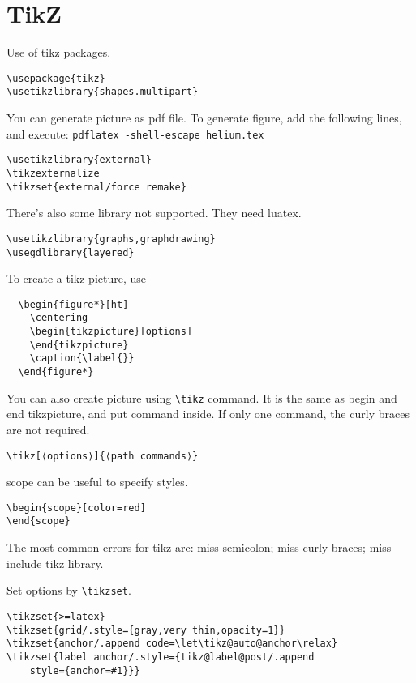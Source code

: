 \section{TikZ}

Use of tikz packages.

\begin{lstlisting}
\usepackage{tikz}
\usetikzlibrary{shapes.multipart}
\end{lstlisting}

You can generate picture as pdf file.  To generate figure, add the
following lines, and execute: \texttt{pdflatex -shell-escape
  helium.tex}

\begin{lstlisting}
\usetikzlibrary{external}
\tikzexternalize
\tikzset{external/force remake}
\end{lstlisting}

There's also some library not supported. They need luatex.
\begin{lstlisting}
\usetikzlibrary{graphs,graphdrawing}
\usegdlibrary{layered}
\end{lstlisting}

To create a tikz picture, use
\begin{lstlisting}
  \begin{figure*}[ht]
    \centering
    \begin{tikzpicture}[options]
    \end{tikzpicture}
    \caption{\label{}}
  \end{figure*}
\end{lstlisting}

You can also create picture using \verb$\tikz$ command. It is the
same as begin and end tikzpicture, and put command inside. If only one
command, the curly braces are not required.
\begin{lstlisting}
\tikz[⟨options⟩]{⟨path commands⟩}
\end{lstlisting}

scope can be useful to specify styles.
\begin{lstlisting}
\begin{scope}[color=red]
\end{scope}
\end{lstlisting}

The most common errors for tikz are: miss semicolon; miss curly
braces; miss include tikz library.

Set options by \verb$\tikzset$.
\begin{lstlisting}
\tikzset{>=latex}
\tikzset{grid/.style={gray,very thin,opacity=1}}
\tikzset{anchor/.append code=\let\tikz@auto@anchor\relax}
\tikzset{label anchor/.style={tikz@label@post/.append
    style={anchor=#1}}}
\end{lstlisting}

